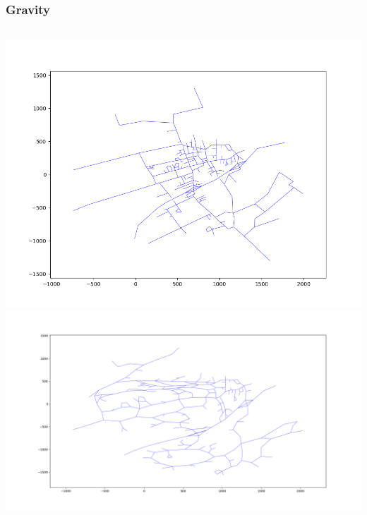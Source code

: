 \documentclass[12pt,t,xcolor=dvipsnames]{beamer}
\begin{document}
\begin{frame}
  \frametitle{Gravity}

  \begin{columns}[t]
  \centering
  \includegraphics[height=.45\textheight]{../pngs/map3_original}\\
  \includegraphics[width=.65\textwidth]{../pngs/map3spread}
  \end{columns}
  
  
\end{frame}
\end{document}
